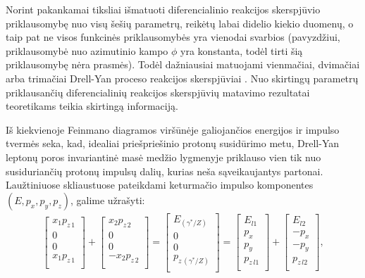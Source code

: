 \documentclass[a4paper, 12pt, oneside]{article}
\newlength\q
\begin{document}
Norint pakankamai tiksliai išmatuoti diferencialinio reakcijos skerspjūvio priklausomybę nuo visų šešių parametrų,
reikėtų labai didelio kiekio duomenų, o taip pat ne visos funkcinės priklausomybės yra vienodai svarbios (pavyzdžiui,
priklausomybė nuo azimutinio kampo $\phi$ yra konstanta, todėl tirti šią priklausomybę nėra prasmės).
Todėl dažniausiai matuojami vienmačiai, dvimačiai arba trimačiai Drell-Yan proceso reakcijos skerspjūviai
\cite{DY_comp1993, DY_CDF1994, DY_D01999, DY_CDF2001, DY_comp2007, DY_CMS2011, DY_CMS2013, DY_ATLAS2013, DY_ATLAS2014,
DY_CMS2015, DY_ATLAS2016, DY_ATLAS2017, DY_CMS2019}.
Nuo skirtingų parametrų priklausančių diferencialinių reakcijos skerspjūvių matavimo rezultatai teoretikams teikia
skirtingą informaciją.

Iš kiekvienoje Feinmano diagramos viršūnėje galiojančios energijos ir impulso tvermės seka, kad, idealiai priešpriešinio
protonų susidūrimo metu, Drell-Yan leptonų poros invariantinė masė medžio lygmenyje priklauso vien
tik nuo susiduriančių protonų impulsų dalių, kurias neša sąveikaujantys partonai.
Laužtiniuose skliaustuose pateikdami keturmačio impulso komponentes $(E,p_x,p_y,p_z)$, galime užrašyti:
\begin{align}
\label{eq:DY4vec}
	\begin{bmatrix}
		x_1p_{z\,1} \\		
		0 \\
		0 \\
		x_1p_{z\,1} \\
	\end{bmatrix}
	+
	\begin{bmatrix}
		x_2p_{z\,2} \\
		0 \\
		0 \\
		-x_2p_{z\,2} \\
	\end{bmatrix}
	=
	\begin{bmatrix}
		E_{(\gamma^*\!/\!Z)} \\
		0 \\
		0 \\
		p_{z\,(\gamma^*\!/\!Z)} \\
	\end{bmatrix}
	=
	\begin{bmatrix}
		E_{l1} \\
		p_{x} \\
		p_{y} \\
		p_{z\,l1} \\
	\end{bmatrix}
	+
	\begin{bmatrix}
		E_{l2} \\
		-p_{x} \\
		-p_{y} \\
		p_{z\,l2} \\
	\end{bmatrix}	
	,
\end{align}
\end{document}
